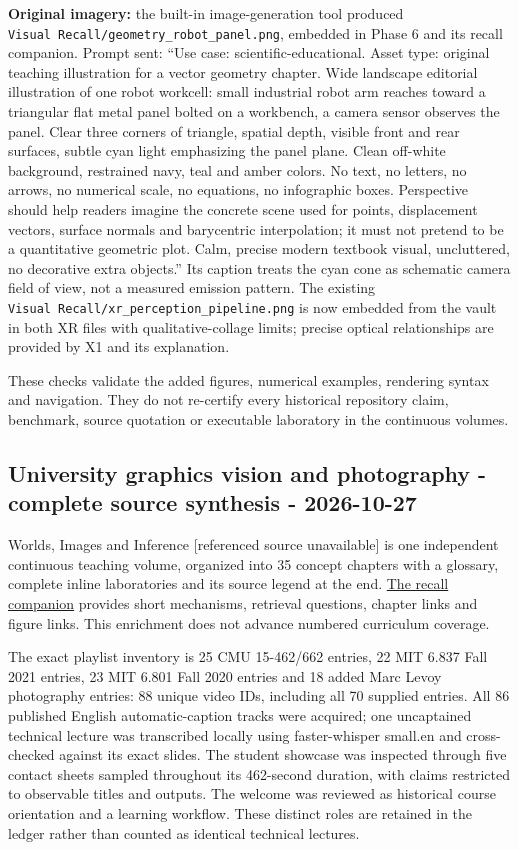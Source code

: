\textbf{Original imagery:} the built-in image-generation tool produced \texttt{Visual\ Recall/geometry\_robot\_panel.png}, embedded in Phase 6 and its recall companion. Prompt sent: ``Use case: scientific-educational. Asset type: original teaching illustration for a vector geometry chapter. Wide landscape editorial illustration of one robot workcell: small industrial robot arm reaches toward a triangular flat metal panel bolted on a workbench, a camera sensor observes the panel. Clear three corners of triangle, spatial depth, visible front and rear surfaces, subtle cyan light emphasizing the panel plane. Clean off-white background, restrained navy, teal and amber colors. No text, no letters, no arrows, no numerical scale, no equations, no infographic boxes. Perspective should help readers imagine the concrete scene used for points, displacement vectors, surface normals and barycentric interpolation; it must not pretend to be a quantitative geometric plot. Calm, precise modern textbook visual, uncluttered, no decorative extra objects.'' Its caption treats the cyan cone as schematic camera field of view, not a measured emission pattern. The existing \texttt{Visual\ Recall/xr\_perception\_pipeline.png} is now embedded from the vault in both XR files with qualitative-collage limits; precise optical relationships are provided by X1 and its explanation.

These checks validate the added figures, numerical examples, rendering syntax and navigation. They do not re-certify every historical repository claim, benchmark, source quotation or executable laboratory in the continuous volumes.

\subsection{University graphics vision and photography - complete source synthesis - 2026-10-27}\label{appendix-a103e7846d21-university-graphics-vision-and-photography---complete-source-synthesis---2026-10-27}

{Worlds, Images and Inference {[}referenced source unavailable{]}} is one independent continuous teaching volume, organized into 35 concept chapters with a glossary, complete inline laboratories and its source legend at the end. \hyperref[appendix-a8f634b076b5]{The recall companion} provides short mechanisms, retrieval questions, chapter links and figure links. This enrichment does not advance numbered curriculum coverage.

The exact playlist inventory is 25 CMU 15-462/662 entries, 22 MIT 6.837 Fall 2021 entries, 23 MIT 6.801 Fall 2020 entries and 18 added Marc Levoy photography entries: 88 unique video IDs, including all 70 supplied entries. All 86 published English automatic-caption tracks were acquired; one uncaptained technical lecture was transcribed locally using faster-whisper small.en and cross-checked against its exact slides. The student showcase was inspected through five contact sheets sampled throughout its 462-second duration, with claims restricted to observable titles and outputs. The welcome was reviewed as historical course orientation and a learning workflow. These distinct roles are retained in the ledger rather than counted as identical technical lectures.

